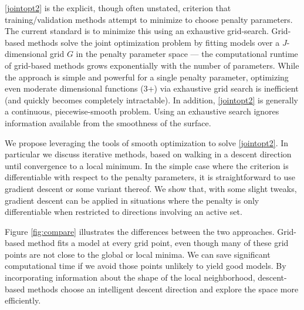\documentclass[10pt,letterpaper]{article}
\begin{document}

\eqref{jointopt2} is the explicit, though often unstated, criterion that training/validation methods attempt to minimize to choose penalty parameters. The current standard is to minimize this using an exhaustive grid-search. Grid-based methods solve the joint optimization problem by fitting models over a $J$-dimensional grid $G$ in the penalty parameter space --- the computational runtime of grid-based methods grows exponentially with the number of parameters. While the approach is simple and powerful for a single penalty parameter, optimizing even moderate dimensional functions (3+) via exhaustive grid search is inefficient (and quickly becomes completely intractable).  In addition, \eqref{jointopt2} is generally a continuous, piecewise-smooth problem. Using an exhaustive search ignores information available from the smoothness of the surface. 

We propose leveraging the tools of smooth optimization to solve \eqref{jointopt2}. In particular we discuss iterative methods, based on walking in a descent direction until convergence to a local minimum. In the simple case where the criterion is differentiable with respect to the penalty parameters, it is straightforward to use gradient descent or some variant thereof. We show that, with some slight tweaks, gradient descent can be applied in situations where the penalty is only differentiable when restricted to directions involving an active set.

Figure \ref{fig:compare} illustrates the differences between the two approaches. Grid-based method fits a model at every grid point, even though many of these grid points are not close to the global or local minima. We can save significant computational time if we avoid those points unlikely to yield good models. By incorporating information about the shape of the local neighborhood, descent-based methods choose an intelligent descent direction and explore the space more efficiently. 
\end{document}
